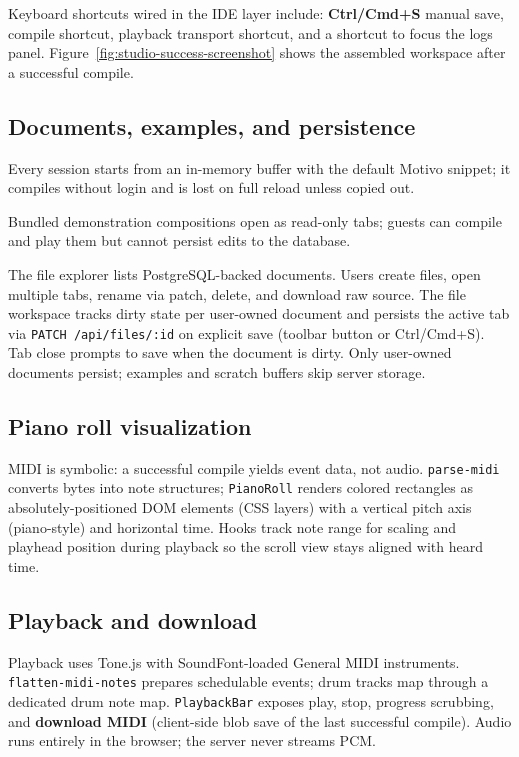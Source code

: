 Keyboard shortcuts wired in the IDE layer include: \textbf{Ctrl/Cmd+S} manual save, compile shortcut, playback transport
shortcut, and a shortcut to focus the logs panel.
Figure~\ref{fig:studio-success-screenshot} shows the assembled workspace after a successful compile.

\subsection{Documents, examples, and persistence}\label{subsec:files-persistence}

 Every session starts from an in-memory buffer with the default Motivo snippet; it compiles
without login and is lost on full reload unless copied out.

 Bundled demonstration compositions open as read-only tabs; guests can compile and play them but
cannot persist edits to the database.

 The file explorer lists PostgreSQL-backed documents.
Users create files, open multiple tabs, rename via patch, delete, and download raw source.
The file workspace tracks dirty state per user-owned document and persists the active tab via
\texttt{PATCH /api/files/:id} on explicit save (toolbar button or Ctrl/Cmd+S).
Tab close prompts to save when the document is dirty.
Only user-owned documents persist; examples and scratch buffers skip server storage.

\subsection{Piano roll visualization}\label{subsec:piano-roll}

MIDI is symbolic: a successful compile yields event data, not audio.
\texttt{parse-midi} converts bytes into note structures; \texttt{PianoRoll} renders colored rectangles as
absolutely-positioned DOM elements (CSS layers) with a vertical pitch axis (piano-style) and horizontal time.
Hooks track note range for scaling and playhead position during playback so the scroll view stays aligned with heard
time.

\subsection{Playback and download}\label{subsec:playback}

Playback uses Tone.js with SoundFont-loaded General MIDI instruments.
\texttt{flatten-midi-notes} prepares schedulable events; drum tracks map through a dedicated drum note map.
\texttt{PlaybackBar} exposes play, stop, progress scrubbing, and \textbf{download MIDI} (client-side blob save of the
last successful compile).
Audio runs entirely in the browser; the server never streams PCM.

